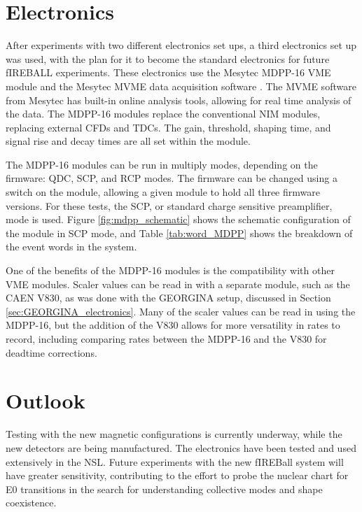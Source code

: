 \section{Electronics}

After experiments with two different electronics set ups, a third electronics set up was used, with the plan for it to become the standard electronics for future fIREBALL experiments. These electronics use the Mesytec MDPP-16 VME module and the Mesytec MVME data acquisition software \citep{mesytec:_mdpp,mesytec:_mvme}. The MVME software from Mesytec has built-in online analysis tools, allowing for real time analysis of the data. The MDPP-16 modules replace the conventional NIM modules, replacing external CFDs and TDCs. The gain, threshold, shaping time, and signal rise and decay times are all set within the module. 

The MDPP-16 modules can be run in multiply modes, depending on the firmware: QDC, SCP, and RCP modes. The firmware can be changed using a switch on the module, allowing a given module to hold all three firmware versions. For these tests, the SCP, or standard charge sensitive preamplifier, mode is used. Figure \ref{fig:mdpp_schematic} shows the schematic configuration of the module in SCP mode, and Table \ref{tab:word_MDPP} shows the breakdown of the event words in the system.





One of the benefits of the MDPP-16 modules is the compatibility with other VME modules. Scaler values can be read in with a separate module, such as the CAEN V830, as was done with the GEORGINA setup, discussed in Section \ref{sec:GEORGINA_electronics}. Many of the scaler values can be read in using the MDPP-16, but the addition of the V830 allows for more versatility in rates to record, including comparing rates between the MDPP-16 and the V830 for deadtime corrections.

\section{Outlook}

Testing with the new magnetic configurations is currently underway, while the new detectors are being manufactured. The electronics have been tested and used extensively in the NSL. Future experiments with the new fIREBall system will have greater sensitivity, contributing to the effort to probe the nuclear chart for E0 transitions in the search for understanding collective modes and shape coexistence.
